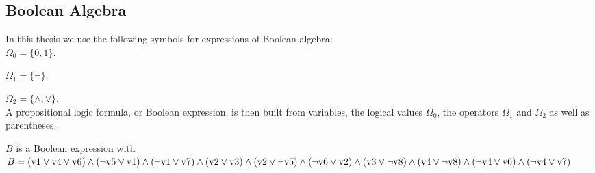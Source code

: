\documentclass[a4paper, 12pt, bibliography=totoc]{scrartcl}
\begin{document}
\subsection{Boolean Algebra}\label{sec:BSP}



In this thesis we use the following symbols for expressions of Boolean algebra:\\

${ \Omega _{0}=\{0 ,1 \}.}$ 

${\Omega _{1}=\{\lnot \},}$

${ \Omega _{2}= \{\land ,\lor \}.}$\\

A propositional logic formula, or Boolean expression, is then built from variables, the logical values $\Omega _{0}$, the operators $\Omega _{1}$ and $\Omega _{2}$ as well as parentheses.

\begin{example}\label{ex:booleanform}
	$B$ is a Boolean expression with\\	
	$B = (\text{v1}\lor \text{v4}\lor \text{v6})\land (\neg \text{v5}\lor \text{v1})\land (\neg \text{v1}\lor \text{v7})\land (\text{v2}\lor \text{v3})\land (\text{v2}\lor \neg \text{v5})
	\land (\neg \text{v6}\lor \text{v2})\land \\
	(\text{v3}\lor \neg \text{v8})\land (\text{v4}\lor \neg \text{v8})\land (\neg \text{v4}\lor \text{v6})\land (\neg \text{v4}\lor \text{v7})$
\end{example}
\end{document}
